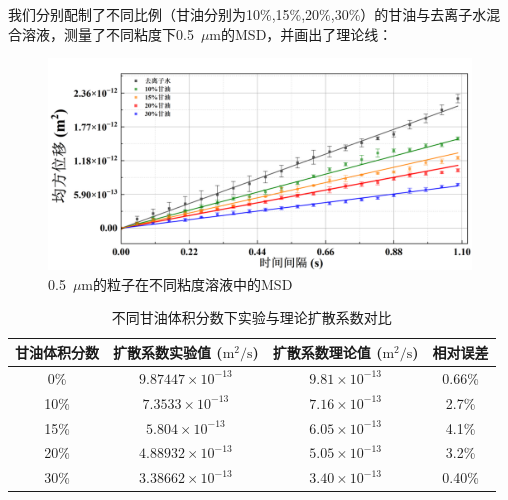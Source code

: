 \documentclass[a4paper]{report} %
\begin{document}
我们分别配制了不同比例（甘油分别为10\%,15\%,20\%,30\%）的甘油与去离子水混合溶液，测量了不同粘度下0.5~$\mu$m的MSD，并画出了理论线：\par
\begin{figure}[H]
    \centering
    \includegraphics[width=0.8\linewidth]{实验数据拟合2.png}
    \caption{0.5~$\mu$m的粒子在不同粘度溶液中的MSD}
    \label{fig:fit2}
\end{figure}
\begin{table}[H]
\centering
\begin{tabular}{cccc}
\hline
甘油体积分数 & 扩散系数实验值 ($\mathrm{m^2/s}$) & 扩散系数理论值 ($\mathrm{m^2/s}$) & 相对误差 \\
\hline
0\%  & $9.87447 \times 10^{-13}$ & $9.81 \times 10^{-13}$ & 0.66\% \\
10\% & $7.3533 \times 10^{-13}$  & $7.16 \times 10^{-13}$ & 2.7\%  \\
15\% & $5.804 \times 10^{-13}$   & $6.05 \times 10^{-13}$ & 4.1\%  \\
20\% & $4.88932 \times 10^{-13}$ & $5.05 \times 10^{-13}$ & 3.2\%  \\
30\% & $3.38662 \times 10^{-13}$ & $3.40 \times 10^{-13}$ & 0.40\% \\
\hline
\end{tabular}
\caption{不同甘油体积分数下实验与理论扩散系数对比}
\end{table}
\end{document}
